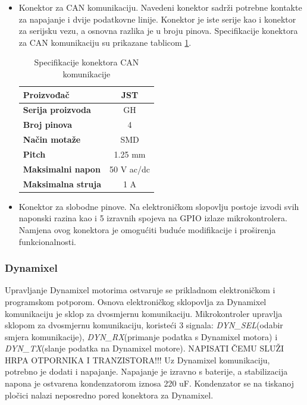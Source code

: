 \documentclass[11pt,a4paper]{article}
\begin{document}
\begin{center}
\begin{itemize}
		
		\item Konektor za CAN komunikaciju. Navedeni konektor sadrži potrebne kontakte za napajanje i dvije podatkovne linije. Konektor je iste serije kao i konektor za serijsku vezu, a osnovna razlika je u broju pinova. Specifikacije konektora za CAN komunikaciju su prikazane tablicom \ref{tab:specifikacija_connector_CAN}.
		
\begin{table}[H]
	\centering
	\caption{Specifikacije konektora CAN komunikacije}
	\label{tab:specifikacija_connector_CAN}
	\begin{tabular}{|l|c|}
		\hline
		\textbf{Proizvođač} & JST \\ \hline 
		\textbf{Serija proizvoda} & GH \\ \hline 
		\textbf{Broj pinova} & 4 \\ \hline 
		\textbf{Način motaže} & SMD    \\ \hline
		\textbf{Pitch} & 1.25 mm    \\ \hline 
		\textbf{Maksimalni napon} & 50 V  ac/dc\\ \hline 
		\textbf{Maksimalna struja} & 1 A \\ \hline
	\end{tabular}
\end{table}
		
		
		\item Konektor za slobodne pinove. Na elektroničkom slopovlju postoje izvodi svih naponski razina kao i 5 izravnih spojeva na GPIO izlaze mikrokontrolera. Namjena ovog konektora je omogućiti buduće modifikacije i proširenja funkcionalnosti.	
		
	\end{itemize}
\end{center}



\subsubsection{Dynamixel}
 Upravljanje Dynamixel motorima ostvaruje se prikladnom elektroničkom i programskom potporom. Osnova elektroničkog sklopovlja za Dynamixel komunikaciju je sklop za dvosmjernu komunikaciju. Mikrokontroler upravlja sklopom za dvosmjernu komunikaciju, koristeći 3 signala: \textit{DYN\_SEL}(odabir smjera komunikacije), \textit{DYN\_RX}(primanje podatka s Dynamixel motora) i \textit{DYN\_TX}(slanje podatka na Dynamixel motore). NAPISATI ČEMU SLUŽI HRPA OTPORNIKA I TRANZISTORA!!! Uz Dynamixel komunikaciju, potrebno je dodati i napajanje. Napajanje je izravno s baterije, a stabilizacija napona je ostvarena kondenzatorom iznosa 220 uF. Kondenzator se na tiskanoj pločici nalazi neposredno pored konektora za Dynamixel.
\end{document}
